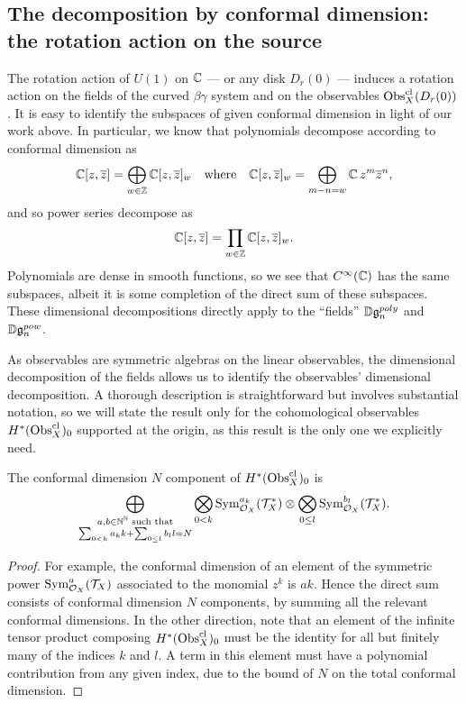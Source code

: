 \subsection{The decomposition by conformal dimension: the rotation action on the source}

The rotation action of $U(1)$ on $\mathbb C$ --- or any disk $D_r(0)$ --- induces a rotation action on 
the fields of the curved $\beta\gamma$ system and on the observables ${\rm Obs}^{\rm cl}_X(D_r(0))$.
It is easy to identify the subspaces of given conformal dimension in light of our work above. 
In particular, we know that polynomials decompose according to conformal dimension as
\[
\mathbb C[z,\overline{z}] = \bigoplus_{w \in \mathbb Z} \mathbb C[z,\overline{z}]_w \quad\text{where}\quad \mathbb C[z,\overline{z}]_w = \bigoplus_{m - n = w} \mathbb C\, z^m \overline{z}^n,
\]
and so power series decompose as
\[
\mathbb C[z,\overline{z}] = \prod_{w \in \mathbb Z} \mathbb C[z,\overline{z}]_w.
\]
Polynomials are dense in smooth functions, so we see that $C^\infty(\mathbb C)$ has the same subspaces,
albeit it is some completion of the direct sum of these subspaces.
These dimensional decompositions directly apply to the ``fields'' $\mathbb D\mathfrak{g}_n^{poly}$ and~$\mathbb D\mathfrak{g}_n^{pow}$.

As observables are symmetric algebras on the linear observables, 
the dimensional decomposition of the fields allows us to identify the observables' dimensional decomposition.
A thorough description is straightforward but involves substantial notation,
so we will state the result only for the cohomological observables $H^*({\rm Obs}^{\rm cl}_X)_0$ 
supported at the origin, as this result is the only one we explicitly need.

\begin{lemma}
The conformal dimension $N$ component of $H^*({\rm Obs}^{\rm cl}_X)_0$ is
\[
\bigoplus_{\substack{a,b \in \mathbb N^\mathbb N \text{ such that}\\ \sum_{0 < k} a_k k + \sum_{0 \leq l} b_l l = N}} \bigotimes_{0 <k } {\rm Sym}^{a_k}_{\mathcal O_X}(\mathcal T^*_X) \otimes \bigotimes_{0 \leq l } {\rm Sym}^{b_l}_{\mathcal O_X}(\mathcal T^*_X).
\]
\end{lemma}

\begin{proof}
For example, the conformal dimension of an element of the symmetric power ${\rm Sym}^a_{\mathcal O_X}(\mathcal T_X)$ associated to the monomial $z^k$ is $ak$.
Hence the direct sum consists of conformal dimension $N$ components, by summing all the relevant conformal dimensions.
In the other direction, note that an element of the infinite tensor product composing $H^*({\rm Obs}^{\rm cl}_X)_0$ 
must be the identity for all but finitely many of the indices $k$ and $l$.
A term in this element must have a polynomial contribution from any given index, due to the bound of $N$ on the total conformal dimension.
\end{proof}

